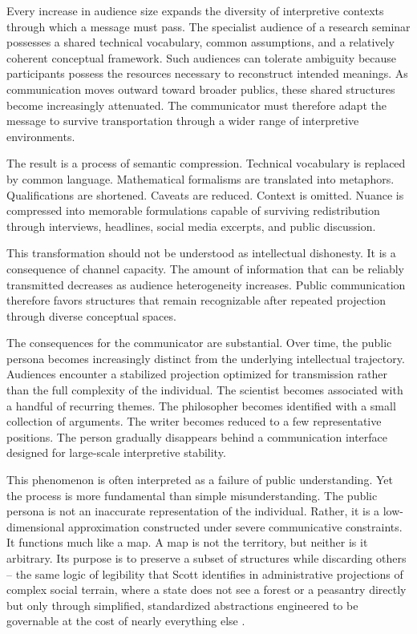 \documentclass[11pt]{article}
\theoremstyle{plain}
\begin{document}
Every increase in audience size expands the diversity of interpretive contexts through which a message must pass. The specialist audience of a research seminar possesses a shared technical vocabulary, common assumptions, and a relatively coherent conceptual framework. Such audiences can tolerate ambiguity because participants possess the resources necessary to reconstruct intended meanings. As communication moves outward toward broader publics, these shared structures become increasingly attenuated. The communicator must therefore adapt the message to survive transportation through a wider range of interpretive environments.

The result is a process of semantic compression. Technical vocabulary is replaced by common language. Mathematical formalisms are translated into metaphors. Qualifications are shortened. Caveats are reduced. Context is omitted. Nuance is compressed into memorable formulations capable of surviving redistribution through interviews, headlines, social media excerpts, and public discussion.

This transformation should not be understood as intellectual dishonesty. It is a consequence of channel capacity. The amount of information that can be reliably transmitted decreases as audience heterogeneity increases. Public communication therefore favors structures that remain recognizable after repeated projection through diverse conceptual spaces.

The consequences for the communicator are substantial. Over time, the public persona becomes increasingly distinct from the underlying intellectual trajectory. Audiences encounter a stabilized projection optimized for transmission rather than the full complexity of the individual. The scientist becomes associated with a handful of recurring themes. The philosopher becomes identified with a small collection of arguments. The writer becomes reduced to a few representative positions. The person gradually disappears behind a communication interface designed for large-scale interpretive stability.

This phenomenon is often interpreted as a failure of public understanding. Yet the process is more fundamental than simple misunderstanding. The public persona is not an inaccurate representation of the individual. Rather, it is a low-dimensional approximation constructed under severe communicative constraints. It functions much like a map. A map is not the territory, but neither is it arbitrary. Its purpose is to preserve a subset of structures while discarding others -- the same logic of legibility that Scott identifies in administrative projections of complex social terrain, where a state does not see a forest or a peasantry directly but only through simplified, standardized abstractions engineered to be governable at the cost of nearly everything else \cite{scott1998}.
\end{document}
